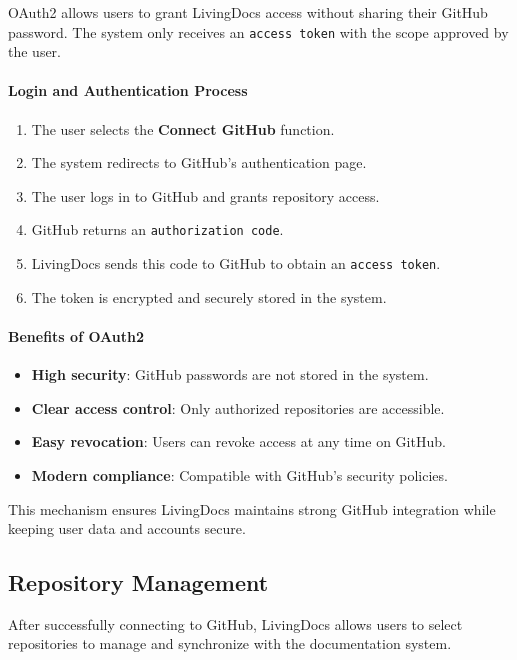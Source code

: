 OAuth2 allows users to grant LivingDocs access without sharing their GitHub password. The system only receives an \texttt{access token} with the scope approved by the user.

\paragraph{Login and Authentication Process}

\begin{enumerate}
    \item The user selects the \textbf{Connect GitHub} function.
    \item The system redirects to GitHub’s authentication page.
    \item The user logs in to GitHub and grants repository access.
    \item GitHub returns an \texttt{authorization code}.
    \item LivingDocs sends this code to GitHub to obtain an \texttt{access token}.
    \item The token is encrypted and securely stored in the system.
\end{enumerate}

\paragraph{Benefits of OAuth2}

\begin{itemize}
    \item \textbf{High security}: GitHub passwords are not stored in the system.
    \item \textbf{Clear access control}: Only authorized repositories are accessible.
    \item \textbf{Easy revocation}: Users can revoke access at any time on GitHub.
    \item \textbf{Modern compliance}: Compatible with GitHub’s security policies.
\end{itemize}

This mechanism ensures LivingDocs maintains strong GitHub integration while keeping user data and accounts secure.

\subsection{Repository Management}

After successfully connecting to GitHub, LivingDocs allows users to select repositories to manage and synchronize with the documentation system.

